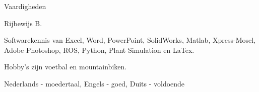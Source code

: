 \begin{cventries}

  
  \cventry
  	{Vaardigheden} %
    {} %
    {} %
    {} %
    {
      \begin{cvitems} %
        \item {Rijbewijs B.}
        \item {Softwarekennis van Excel, Word, PowerPoint, SolidWorks, Matlab, Xpress-Mosel, Adobe Photoshop, ROS, Python, Plant Simulation en LaTex.}
        \item {Hobby's zijn voetbal en mountainbiken.}
        \item {Nederlands - moedertaal, Engels - goed, Duits - voldoende}
      \end{cvitems}
	}
    
\end{cventries}

